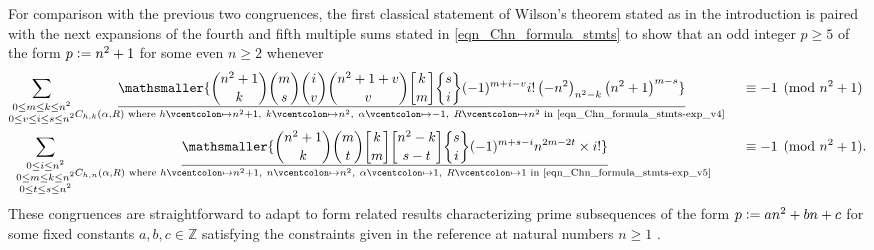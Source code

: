 \documentclass[12pt,reqno]{article}
\numberwithin{sfootnote}{section}
\numberwithin{equation}{section}
\theoremstyle{DefaultTheoremStyle}
\theoremstyle{definition}
\newcommand{\defequals}{\ensuremath{\vcentcolon=}}
\newcommand{\defmapsto}{\ensuremath{\vcentcolon\mapsto}}
\newcommand{\gkpSI}[2]{\ensuremath{\genfrac{\lbrack}{\rbrack}{0pt}{}{#1}{#2}}}
\newcommand{\gkpSII}[2]{\ensuremath{\genfrac{\{}{\}}{0pt}{}{#1}{#2}}}
\newcommand{\Pochhammer}[2]{\ensuremath{\left(#1\right)_{#2}}}
\begin{document}
For comparison with the previous two congruences, the 
first classical statement of Wilson's theorem 
stated as in the introduction is paired 
with the next expansions of the fourth and fifth multiple sums stated in 
\eqref{eqn_Chn_formula_stmts} 
to show that an odd integer $p \geq 5$ of the form 
$p \defequals n^2+1$ for some even $n \geq 2$ whenever 
\begin{align*} 
\sum\limits_{\substack{0 \leq m \leq k \leq n^2 \\ 
             0 \leq v \leq i \leq s \leq n^2} 
             } & 
     \underset{C_{h,k}(\alpha, R) \text{ where } 
          h \defmapsto n^2+1,\ k \defmapsto n^2,\ 
          \alpha \defmapsto -1,\ R \defmapsto n^2 
          \text{ in \eqref{eqn_Chn_formula_stmts-exp_v4} }}{\underline{ 
     \mathsmaller{
     \binom{n^2+1}{k} \binom{m}{s} \binom{i}{v} \binom{n^2+1+v}{v} 
     \gkpSI{k}{m} \gkpSII{s}{i} (-1)^{m+i-v} i! \Pochhammer{-n^2}{n^2-k} 
     \left(n^2 + 1\right)^{m-s}}}} 
     && \equiv -1 \pmod{n^2+1} \\ 
\sum\limits_{\substack{0 \leq i \leq n^2 \\ 
                       0 \leq m \leq k \leq n^2 \\ 
                       0 \leq t \leq s \leq n^2} 
                 } & 
     \underset{C_{h,n}(\alpha, R) \text{ where } 
          h \defmapsto n^2+1,\  n \defmapsto n^2,\ 
          \alpha \defmapsto 1,\ R \defmapsto 1 
          \text{ in \eqref{eqn_Chn_formula_stmts-exp_v5} }}{\underline{ 
     \mathsmaller{
     \binom{n^2+1}{k} \binom{m}{t} \gkpSI{k}{m} 
     \gkpSI{n^2-k}{s-t} \gkpSII{s}{i} 
     (-1)^{m+s-i} n^{2m-2t} 
     \times i! 
     }} 
     } 
     && \equiv -1 \pmod{n^2+1}. 
\end{align*} 
These congruences are straightforward to adapt to 
form related results characterizing prime subsequences of the form 
$p \defequals an^2+bn+c$ for some fixed constants 
$a,b,c \in \mathbb{Z}$ satisfying the constraints given in the 
reference at natural numbers $n \geq 1$ 
\citep[\S 2.8]{HARDYWRIGHTNUMT}. 
\end{document}

